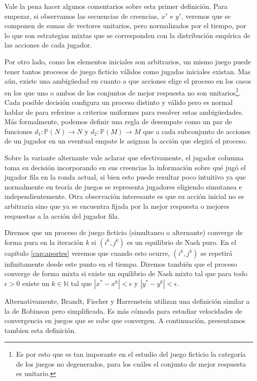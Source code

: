 Vale la pena hacer algunos comentarios sobre esta primer definición. Para empezar, si observamos las secuencias de creencias, $x^\tau$ e $y^\tau$, veremos que se componen de sumas de vectores unitarios, pero normalizados por el tiempo, por lo que son estrategias mixtas que se corresponden con la distribución empírica de las acciones de cada jugador.

Por otro lado, como los elementos iniciales son arbitrarios, un mismo juego puede tener tantos procesos de juego ficticio válidos como jugadas iniciales existan. Mas aún, existe una ambigüedad en cuanto a que acciones elige el proceso en los casos en los que uno o ambos de los conjuntos de mejor respuesta no son unitarios\footnote{Es por esto que es tan imporante en el estudio del juego ficticio la categoría de los juegos no degenerados, para los cuáles el conjunto de mejor respuesta es unitario.}. Cada posible decisión configura un proceso distinto y válido pero es normal hablar de  para referirse a criterios uniformes para resolver estas ambigüedades. Más formalmente, podemos definir una regla de desempate como un par de funciones $d_1: \mathbb{P}(N) \rightarrow N$ y $d_2: \mathbb{P}(M) \rightarrow M$ que a cada subconjunto de acciones de un jugador en un eventual empate le asignan la acción que elegirá el proceso.

Sobre la variante alternante vale aclarar que efectivamente, el jugador columna toma su decisión incorporando en sus creencias la información sobre qué jugó el jugador fila en la ronda actual, si bien esto puede resultar poco intuitivo ya que normalmente en teoría de juegos se representa jugadores eligiendo simutanea e independientemente. Otra observación interesante es que su acción inicial no es arbitraria sino que ya se encuentra fijada por la mejor respuesta o mejores respuestas a la acción del jugador fila.

Diremos que un proceso de juego ficticio (simultaneo o alternante) converge de forma pura en la iteración $k$ si $(i^k, j^k)$ es un equilibrio de Nash puro. En el capítulo \ref{cap:aportes} veremos que cuando esto ocurre, $(i^k, j^k)$ se repetirá infinitamente desde este punto en el tiempo. Diremos también que el proceso converge de forma mixta si existe un equilibrio de Nash mixto tal que para todo $\epsilon > 0$ existe un $k \in \mathbb{N}$ tal que $|x^* - x^k| < \epsilon$ y $|y^* - y^k| < \epsilon$.

Alternativamente, Brandt, Fischer y Harrenstein utilizan una definición similar a la de Robinson \cite{robinson:zerosum} pero simplificada. Es más cómoda para estudiar velocidades de convergencia en juegos que se sabe que convergen. A continuación, presentamos tambien esta definición.

